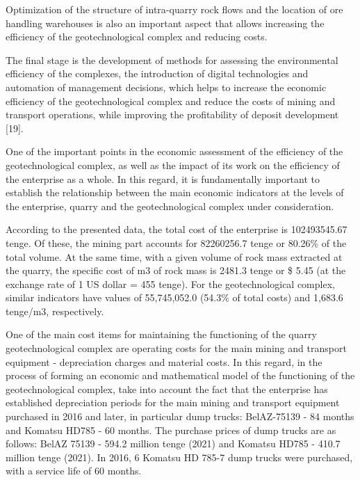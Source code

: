 \begin{multicols}{2}
Optimization of the structure of intra-quarry rock flows and the
location of ore handling warehouses is also an important aspect that
allows increasing the efficiency of the geotechnological complex and
reducing costs.

The final stage is the development of methods for assessing the
environmental efficiency of the complexes, the introduction of digital
technologies and automation of management decisions, which helps to
increase the economic efficiency of the geotechnological complex and
reduce the costs of mining and transport operations, while improving the
profitability of deposit development {[}19{]}.

One of the important points in the economic assessment of the efficiency
of the geotechnological complex, as well as the impact of its work on
the efficiency of the enterprise as a whole. In this regard, it is
fundamentally important to establish the relationship between the main
economic indicators at the levels of the enterprise, quarry and the
geotechnological complex under consideration.

According to the presented data, the total cost of the enterprise is
102493545.67 tenge. Of these, the mining part accounts for 82260256.7
tenge or 80.26\% of the total volume. At the same time, with a given
volume of rock mass extracted at the quarry, the specific cost of m3 of
rock mass is 2481.3 tenge or \$ 5.45 (at the exchange rate of 1 US
dollar = 455 tenge). For the geotechnological complex, similar
indicators have values \hspace{0pt}\hspace{0pt}of 55,745,052.0 (54.3\%
of total costs) and 1,683.6 tenge/m3, respectively.

One of the main cost items for maintaining the functioning of the quarry
geotechnological complex are operating costs for the main mining and
transport equipment - depreciation charges and material costs. In this
regard, in the process of forming an economic and mathematical model of
the functioning of the geotechnological complex, take into account the
fact that the enterprise has established depreciation periods for the
main mining and transport equipment purchased in 2016 and later, in
particular dump trucks: BelAZ-75139 - 84 months and Komatsu HD785 - 60
months. The purchase prices of dump trucks are as follows: BelAZ 75139 -
594.2 million tenge (2021) and Komatsu HD785 - 410.7 million tenge
(2021). In 2016, 6 Komatsu HD 785-7 dump trucks were purchased, with a
service life of 60 months.


\end{multicols}
